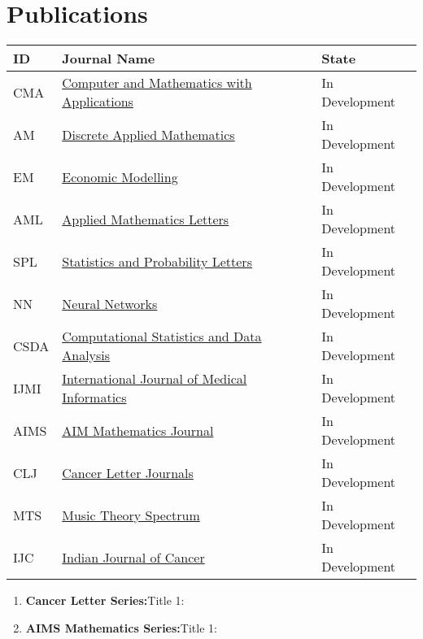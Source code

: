 \documentclass{ResumeDesignFormat1}
\begin{document}
\section{Publications}
\begin{table}[ht]
\footnotesize
\centering
\begin{tabular}{p{1cm}p{6cm}p{2cm}}
 \hline
 ID & Journal Name & State \\ 
 \hline
CMA & {\href{http://mathlearningspace.weebly.com/}{\textcolor{c5}{Computer and Mathematics with Applications}}} & In Development\\
AM & {\href{http://mathlearningspace.weebly.com/}{\textcolor{c2}{Discrete Applied Mathematics}}} & In Development \\
EM & {\href{http://mathlearningspace.weebly.com/}{\textcolor{c1}{Economic Modelling}}} & In Development \\
AML & {\href{http://mathlearningspace.weebly.com/}{\textcolor{c2}{Applied Mathematics Letters}}} & In Development\\
SPL & {\href{http://mathlearningspace.weebly.com/}{\textcolor{c3}{Statistics and Probability Letters}}} & In Development \\
NN & {\href{http://mathlearningspace.weebly.com/}{\textcolor{c4}{Neural Networks}}} & In Development\\
CSDA & {\href{http://mathlearningspace.weebly.com/}{\textcolor{c1}{Computational Statistics and Data Analysis}}} & In Development\\
IJMI & {\href{http://mathlearningspace.weebly.com/}{\textcolor{c5}{International Journal of Medical Informatics}}} & In Development\\
AIMS & {\href{http://mathlearningspace.weebly.com/}{\textcolor{c5}{AIM Mathematics Journal}}} & In Development\\
CLJ & {\href{http://mathlearningspace.weebly.com/}{\textcolor{c5}{Cancer Letter Journals}}} & In Development\\
MTS & {\href{http://mathlearningspace.weebly.com/}{\textcolor{c5}{Music Theory Spectrum}}} & In Development\\
IJC & {\href{http://mathlearningspace.weebly.com/}{\textcolor{c5}{Indian Journal of Cancer}}} & In Development\\
 \hline
\end{tabular}
\end{table}

\begin{enumerate}
\item \textbf{Cancer Letter Series:}\textcolor{c4}{Title 1:}
\item \textbf{AIMS Mathematics Series:}{Title 1:}
\end{enumerate}
\end{document}
